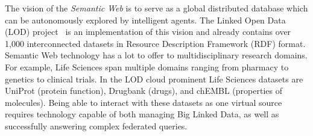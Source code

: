 
The vision of the \emph{Semantic Web} is to serve as a global distributed database which can be autonomously explored by intelligent agents. The Linked Open Data (LOD) project~\cite{bizer2007interlinking} is an implementation of this vision and already contains over 1,000 interconnected datasets in Resource Description Framework (RDF) format. 
Semantic Web technology has a lot to offer to multidisciplinary research domains.
For example, Life Sciences span multiple domains ranging from pharmacy to genetics to clinical trials. In the LOD cloud prominent Life Sciences datasets are 
UniProt (protein function), Drugbank (drugs), and chEMBL (properties of molecules).
Being able to interact with these datasets as one virtual source requires technology capable of both managing Big Linked Data, as well as successfully answering complex federated queries.


